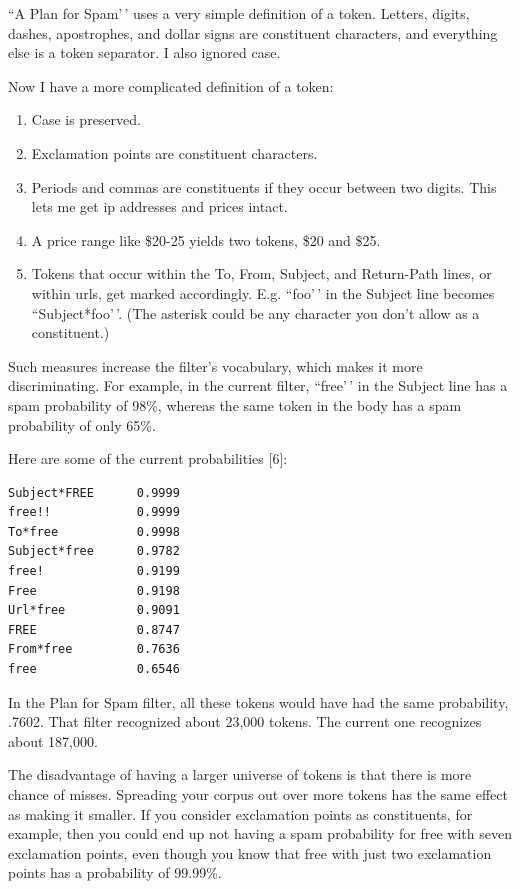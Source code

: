 ``A Plan for Spam'\,' uses a very simple definition of a token. Letters,
digits, dashes, apostrophes, and dollar signs are constituent
characters, and everything else is a token separator. I also ignored
case.

Now I have a more complicated definition of a token:

\begin{enumerate}
\def\labelenumi{\arabic{enumi}.}
\item
  Case is preserved.
\item
  Exclamation points are constituent characters.
\item
  Periods and commas are constituents if they occur between two digits.
  This lets me get ip addresses and prices intact.
\item
  A price range like \$20-25 yields two tokens, \$20 and \$25.
\item
  Tokens that occur within the To, From, Subject, and Return-Path lines,
  or within urls, get marked accordingly. E.g. ``foo'\,' in the Subject
  line becomes ``Subject*foo'\,'. (The asterisk could be any character
  you don't allow as a constituent.)
\end{enumerate}

Such measures increase the filter's vocabulary, which makes it more
discriminating. For example, in the current filter, ``free'\,' in the
Subject line has a spam probability of 98\%, whereas the same token in
the body has a spam probability of only 65\%.

Here are some of the current probabilities {[}6{]}:

\begin{verbatim}
Subject*FREE      0.9999
free!!            0.9999
To*free           0.9998
Subject*free      0.9782
free!             0.9199
Free              0.9198
Url*free          0.9091
FREE              0.8747
From*free         0.7636
free              0.6546
\end{verbatim}

In the Plan for Spam filter, all these tokens would have had the same
probability, .7602. That filter recognized about 23,000 tokens. The
current one recognizes about 187,000.

The disadvantage of having a larger universe of tokens is that there is
more chance of misses. Spreading your corpus out over more tokens has
the same effect as making it smaller. If you consider exclamation points
as constituents, for example, then you could end up not having a spam
probability for free with seven exclamation points, even though you know
that free with just two exclamation points has a probability of 99.99\%.

